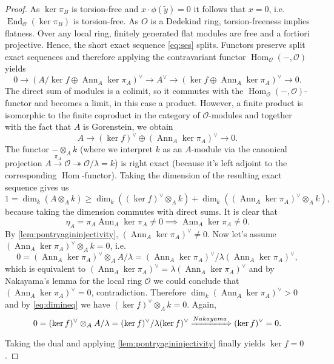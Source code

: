 \documentclass{article}
\theoremstyle{plain}%
\theoremstyle{definition}
\theoremstyle{remark}
\newcommand{\ann}{\operatorname{Ann}}
\renewcommand{\hom}{\operatorname{Hom}}
\begin{document}
\begin{proof}
    As \(\ker \pi_B\) is torsion-free and \(x \cdot \phi(\tilde y) = 0\) it follows that \(x = 0\), i.e.
    \(\operatorname{End}_\mathcal{O}(\ker \pi_B)\) is torsion-free.
    As \(O\) is a Dedekind ring, torsion-freeness implies flatness. Over any local ring, finitely generated flat
    modules are free and a fortiori projective. Hence, the short exact sequence \eqref{eq:ses} splits.
    Functors preserve split exact sequences and therefore applying the contravariant functor
    \(\hom_\mathcal{O}(-, \mathcal{O})\) yields
    \[
        0 \longrightarrow (A/\ker f \oplus \ann_A \ker \pi_A)^\vee  \longrightarrow A^\vee
        \longrightarrow (\ker f \oplus \ann_A \ker \pi_A)^\vee \longrightarrow 0.
    \]
    The direct sum of modules is a colimit, so it commutes with the 
    \(\hom_\mathcal{O}(-, \mathcal{O})\)-functor and becomes a limit, in this case a product.
    However, a finite product is isomorphic to the finite coproduct in the category of \(\mathcal{O}\)-modules
    and together with the fact that \(A\) is Gorenstein, we obtain
    \[
        A \longrightarrow (\ker f)^\vee \oplus (\ann_A \ker \pi_A)^\vee \longrightarrow 0.
    \]
    The functor \(- \otimes_A k\) (where we interpret \(k\) as an \(A\)-module via the canonical projection
    \(A \xrightarrow{\pi_A} \mathcal{O} \twoheadrightarrow \mathcal{O}/\lambda = k\)) 
    is right exact (because it's left adjoint to the corresponding \(\hom\)-functor).
    Taking the dimension of the resulting exact sequence gives us 
    \[
        1 = \dim_k(A\otimes_A k) \geq \dim_k ((\ker f)^\vee \otimes_A k)
        + \dim_k ((\ann_A \ker \pi_A)^\vee\otimes_A k),
        \tag{\textasteriskcentered\textasteriskcentered} \label{eq:dimineq}
    \]
    because taking the dimension commutes with direct sums.
    It is clear that 
    \[
        \eta_A = \pi_A \ann_A \ker \pi_A \neq 0 \implies \ann_A \ker \pi_A \neq 0.
    \]
    By \cref{lem:pontryagininjectivity}, \((\ann_A\ker \pi_A)^\vee \neq 0\).
    Now let's assume \((\ann_A\ker \pi_A)^\vee \otimes_A k = 0\), i.e.
    \[
        0 = (\ann_A\ker \pi_A)^\vee \otimes_A A/\lambda = (\ann_A\ker \pi_A)^\vee/\lambda (\ann_A\ker \pi_A)^\vee,
    \]
    which is equivalent to \((\ann_A\ker \pi_A)^\vee = \lambda (\ann_A\ker \pi_A)^\vee\) and
    by Nakayama's lemma for the local ring \(\mathcal{O}\) we could conclude that \((\ann_A\ker \pi_A)^\vee = 0\),
    contradiction. Therefore \(\dim_k (\ann_A\ker \pi_A)^\vee > 0\) and by \eqref{eq:dimineq} 
    we have \((\ker f)^\vee \otimes_A k = 0\).
    Again,
    \[
        0 = (\ker f)^\vee \otimes_A A/\lambda = (\ker f)^\vee/\lambda(\ker f)^\vee \xRightarrow{Nakayama} (\ker f)^\vee = 0.
    \]
    Taking the dual and applying \cref{lem:pontryagininjectivity} finally yields \(\ker f = 0\).
\end{proof}
\end{document}
